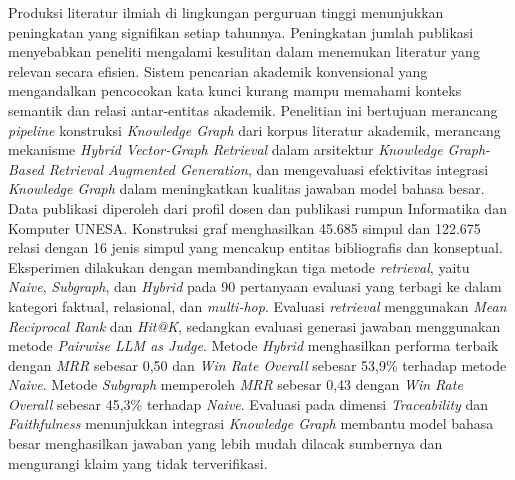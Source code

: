 \documentclass{SkripsiUnesa}
\begin{document}


\Awal
\HalamanJudul
\SampulDalam

\begin{Abstrak}
    Produksi literatur ilmiah di lingkungan perguruan tinggi menunjukkan peningkatan yang signifikan setiap tahunnya. Peningkatan jumlah publikasi menyebabkan peneliti mengalami kesulitan dalam menemukan literatur yang relevan secara efisien. Sistem pencarian akademik konvensional yang mengandalkan pencocokan kata kunci kurang mampu memahami konteks semantik dan relasi antar-entitas akademik. Penelitian ini bertujuan merancang \textit{pipeline} konstruksi \textit{Knowledge Graph} dari korpus literatur akademik, merancang mekanisme \textit{Hybrid Vector-Graph Retrieval} dalam arsitektur \textit{Knowledge Graph-Based Retrieval Augmented Generation}, dan mengevaluasi efektivitas integrasi \textit{Knowledge Graph} dalam meningkatkan kualitas jawaban model bahasa besar. Data publikasi diperoleh dari profil dosen dan publikasi rumpun Informatika dan Komputer UNESA. Konstruksi graf menghasilkan 45.685 simpul dan 122.675 relasi dengan 16 jenis simpul yang mencakup entitas bibliografis dan konseptual. Eksperimen dilakukan dengan membandingkan tiga metode \textit{retrieval}, yaitu \textit{Naive}, \textit{Subgraph}, dan \textit{Hybrid} pada 90 pertanyaan evaluasi yang terbagi ke dalam kategori faktual, relasional, dan \textit{multi-hop}. Evaluasi \textit{retrieval} menggunakan \textit{Mean Reciprocal Rank} dan \textit{Hit@K}, sedangkan evaluasi generasi jawaban menggunakan metode \textit{Pairwise LLM as Judge}. Metode \textit{Hybrid} menghasilkan performa terbaik dengan \textit{MRR} sebesar 0,50 dan \textit{Win Rate Overall} sebesar 53,9\% terhadap metode \textit{Naive}. Metode \textit{Subgraph} memperoleh \textit{MRR} sebesar 0,43 dengan \textit{Win Rate Overall} sebesar 45,3\% terhadap \textit{Naive}. Evaluasi pada dimensi \textit{Traceability} dan \textit{Faithfulness} menunjukkan integrasi \textit{Knowledge Graph} membantu model bahasa besar menghasilkan jawaban yang lebih mudah dilacak sumbernya dan mengurangi klaim yang tidak terverifikasi.

\end{Abstrak}
\end{document}
